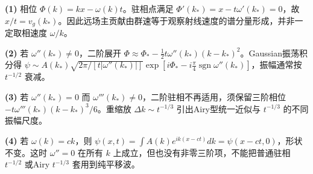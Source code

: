 \par\noindent\textbf{(1)} 相位 \(\Phi(k)=kx-\omega(k)t\)。驻相点满足 \(\Phi'(k_*)=x-t\omega'(k_*)=0\)，故 \(x/t=v_g(k_*)\)。因此远场主贡献由群速等于观察射线速度的谱分量形成，并非一定取相速度 \(\omega/k\)。
\par\noindent\textbf{(2)} 若 \(\omega''(k_*)\ne0\)，二阶展开 \(\Phi\approx\Phi_*-\frac12t\omega''(k_*)(k-k_*)^2\)。Gaussian振荡积分得 \(\psi\sim A(k_*)\sqrt{2\pi/[t|\omega''(k_*)|]}\exp[i\Phi_*-i\frac\pi4\operatorname{sgn}\omega''(k_*)]\)，振幅通常按 \(t^{-1/2}\) 衰减。
\par\noindent\textbf{(3)} 若 \(\omega''(k_*)=0\) 而 \(\omega'''(k_*)\ne0\)，二阶驻相不再适用，须保留三阶相位 \(-t\omega'''(k_*)(k-k_*)^3/6\)。重缩放 \(\Delta k\sim t^{-1/3}\) 引出Airy型统一近似与 \(t^{-1/3}\) 的不同振幅尺度。
\par\noindent\textbf{(4)} 若 \(\omega(k)=ck\)，则 \(\psi(x,t)=\int A(k)e^{ik(x-ct)}dk=\psi(x-ct,0)\)，形状不变。这时 \(\omega''=0\) 在所有 \(k\) 上成立，但也没有非零三阶项，不能把普通驻相 \(t^{-1/2}\) 或Airy \(t^{-1/3}\) 套用到纯平移波。
